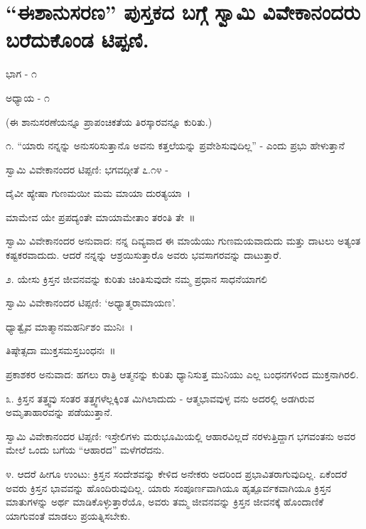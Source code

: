 
\chapter{“ಈಶಾನುಸರಣ” ಪುಸ್ತಕದ ಬಗ್ಗೆ ಸ್ವಾಮಿ ವಿವೇಕಾನಂದರು ಬರೆದುಕೊಂಡ ಟಿಪ್ಪಣಿ.}

\begin{center}
ಭಾಗ - ೧
\end{center}

\begin{center}
ಅಧ್ಯಾಯ - ೧
\end{center}

\begin{center}
(ಈ ಶಾನುಸರಣೆಯನ್ನೂ ಪ್ರಾಪಂಚಿಕತೆಯ ತಿರಸ್ಕಾರವನ್ನೂ ಕುರಿತು.)
\end{center}

೧. “ಯಾರು ನನ್ನನ್ನು ಅನುಸರಿಸುತ್ತಾನೊ ಅವನು ಕತ್ತಲೆಯನ್ನು ಪ್ರವೇಶಿಸುವುದಿಲ್ಲ” - ಎಂದು ಪ್ರಭು ಹೇಳುತ್ತಾನೆ 

ಸ್ವಾಮಿ ವಿವೇಕಾನಂದರ ಟಿಪ್ಪಣಿ: ಭಗವದ್ಗೀತೆ ೭.೧೪ -

ದೈವೀ ಹ್ಯೇಷಾ ಗುಣಮಯೀ ಮಮ ಮಾಯಾ ದುರತ್ಯಯಾ~।

ಮಾಮೇವ ಯೇ ಪ್ರಪದ್ಯಂತೇ ಮಾಯಾಮೇತಾಂ ತರಂತಿ ತೇ~॥

ಸ್ವಾಮಿ ವಿವೇಕಾನಂದರ ಅನುವಾದ: ನನ್ನ ದಿವ್ಯವಾದ ಈ ಮಾಯೆಯು ಗುಣಮಯವಾದುದು ಮತ್ತು ದಾಟಲು ಅತ್ಯಂತ ಕಷ್ಟಕರವಾದುದು. ಆದರೆ ನನ್ನನ್ನು ಆಶ್ರಯಿಸುತ್ತಾರೊ ಅವರು ಭವಸಾಗರವನ್ನು ದಾಟುತ್ತಾರೆ.

೨. ಯೇಸು ಕ್ರಿಸ್ತನ ಜೀವನವನ್ನು ಕುರಿತು ಚಿಂತಿಸುವುದೇ ನಮ್ಮ ಪ್ರಧಾನ ಸಾಧನೆಯಾಗಲಿ 

ಸ್ವಾಮಿ ವಿವೇಕಾನಂದರ ಟಿಪ್ಪಣಿ: ‘ಅಧ್ಯಾತ್ಮರಾಮಾಯಣ’.

ಧ್ಯಾತ್ವೈವ ಮಾತ್ಮಾನಮಹರ್ನಿಶಂ ಮುನಿಃ~।

ತಿಷ್ಠೇತ್ಸದಾ ಮುಕ್ತಸಮಸ್ತಬಂಧನಃ~॥

ಪ್ರಕಾಶಕರ ಅನುವಾದ: ಹಗಲು ರಾತ್ರಿ ಆತ್ಮನನ್ನು ಕುರಿತು ಧ್ಯಾನಿಸುತ್ತ ಮುನಿಯು ಎಲ್ಲ ಬಂಧನಗಳಿಂದ ಮುಕ್ತನಾಗಿರಲಿ.

೩. ಕ್ರಿಸ್ತನ ತತ್ತ್ವವು ಸಂತರ ತತ್ತ್ವಗಳೆಲ್ಲಕ್ಕಿಂತ ಮಿಗಿಲಾದುದು - ಆತ್ಮಭಾವವುಳ್ಳ ವನು ಅದರಲ್ಲಿ ಅಡಗಿರುವ ಅಮೃತಾಹಾರವನ್ನು ಪಡೆಯುತ್ತಾನೆ. 

ಸ್ವಾಮಿ ವಿವೇಕಾನಂದರ ಟಿಪ್ಪಣಿ: ಇಸ್ರೇಲಿಗಳು ಮರುಭೂಮಿಯಲ್ಲಿ ಆಹಾರವಿಲ್ಲದೆ ನರಳುತ್ತಿದ್ದಾಗ ಭಗವಂತನು ಅವರ ಮೇಲೆ ಒಂದು ಬಗೆಯ “ಆಹಾರದ” ಮಳೆಗರೆದನು.

೪. ಆದರೆ ಹೀಗೂ ಉಂಟು: ಕ್ರಿಸ್ತನ ಸಂದೇಶವನ್ನು ಕೇಳಿದ ಅನೇಕರು ಅದರಿಂದ ಪ್ರಭಾವಿತರಾಗುವುದಿಲ್ಲ. ಏಕೆಂದರೆ ಅವರು ಕ್ರಿಸ್ತನ ಭಾವವನ್ನು ಹೊಂದಿರುವುದಿಲ್ಲ. ಯಾರು ಸಂಪೂರ್ಣವಾಗಿಯೂ ಹೃತ್ಪೂರ್ವಕವಾಗಿಯೂ ಕ್ರಿಸ್ತನ ಮಾತುಗಳನ್ನು ಅರ್ಥ ಮಾಡಿಕೊಳ್ಳುತ್ತಾರೆಯೊ, ಅವರು ತಮ್ಮ ಜೀವನವನ್ನು ಕ್ರಿಸ್ತನ ಜೀವನಕ್ಕೆ ಹೊಂದಾಣಿಕೆ ಯಾಗುವಂತೆ ಮಾಡಲು ಪ್ರಯತ್ನಿಸಬೇಕು. 

